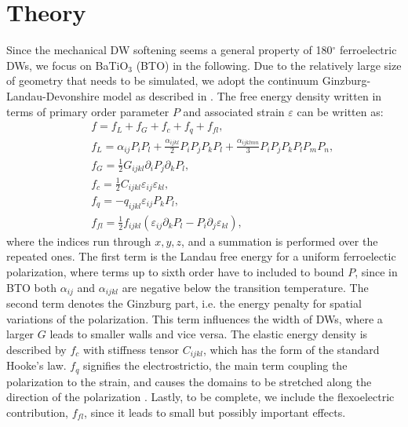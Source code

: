 
\section{Theory}
Since the mechanical DW softening seems a general property of 180$^\circ$ ferroelectric DWs, we focus on BaTiO$_3$ (BTO) in the following.
Due to the relatively large size of geometry that needs to be simulated, we adopt the continuum Ginzburg-Landau-Devonshire model as described in \cite{Marton2010}.  
The free energy density written in terms of primary order parameter $P$ and associated strain $\varepsilon$ can be written as:
\begin{eqnarray}\label{eq:BTO_energy}
&&f = f_{L}+f_{G}+f_{c}+f_{q}+f_{fl},\\
&&f_{L} = \alpha_{ij}P_iP_l + \frac{\alpha_{ijkl}}{2}P_{i}P_{j}P_{k}P_{l} + \frac{\alpha_{ijklmn}}{3} P_i P_j P_k P_l P_m P_n,\\
&&f_{G} = \frac{1}{2}G_{ijkl}\partial_i P_j\partial_k P_l,\\
&&f_{c} = \frac{1}{2}C_{ijkl}\varepsilon_{ij}\varepsilon_{kl},\\
&&f_{q}= - q_{ijkl}\varepsilon_{ij}P_{k}P_{l},\label{eq:qpp}\\
&&f_{fl}=\frac{1}{2}f_{ijkl}(\varepsilon_{ij}\partial_k P_l - P_i\partial_j\varepsilon_{kl}),
\end{eqnarray}
where the indices run through ${x,y,z}$, and a summation is performed over the repeated ones.
The first term is the Landau free energy for a uniform ferroelectic polarization, where terms up to sixth order have to included to bound $P$, since in BTO both $\alpha_{ij}$ and $\alpha_{ijkl}$ are negative below the transition temperature.
The second term denotes the Ginzburg part, i.e. the energy penalty for spatial variations of the polarization.
This term influences the width of DWs, where a larger $G$ leads to smaller walls and vice versa.
The elastic energy density is described by $f_c$ with stiffness tensor $C_{ijkl}$, which has the form of the standard Hooke's law.
$f_q$ signifies the electrostrictio, the main term coupling the polarization to the strain, and causes the domains to be stretched along the direction of the polarization .
Lastly, to be complete, we include the flexoelectric contribution, $f_{fl}$, since it leads to small but possibly important effects.

